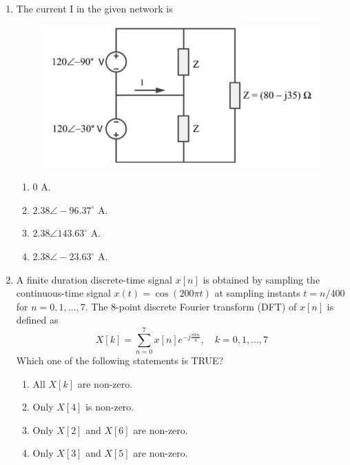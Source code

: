 \documentclass[a4paper, 11pt]{article}
\begin{document}
\begin{enumerate}
    \item The current I in the given network is
    \begin{figure}[H]
        \centering
        \includegraphics[width=0.5\columnwidth]{figs/Q28.png}
        \caption*{}
        \label{fig:q38}
    \end{figure}
    \begin{enumerate}
        \item 0 A.
        \item $2.38\angle-96.37^{\circ}$ A.
        \item $2.38\angle143.63^{\circ}$ A.
        \item $2.38\angle-23.63^{\circ}$ A.
    \end{enumerate}

    \hfill{}
    
    \item A finite duration discrete-time signal $x[n]$ is obtained by sampling the continuous-time signal $x(t)=\cos(200\pi t)$ at sampling instants $t = n/400$ for $n=0, 1, \dots, 7$. The 8-point discrete Fourier transform (DFT) of $x[n]$ is defined as 
    $$X[k] = \sum_{n=0}^{7} x[n] e^{-j\frac{\pi kn}{4}}, \quad k=0,1,\dots,7$$
    Which one of the following statements is TRUE?
    \begin{enumerate}
        \item All $X[k]$ are non-zero.
        \item Only $X[4]$ is non-zero.
        \item Only $X[2]$ and $X[6]$ are non-zero.
        \item Only $X[3]$ and $X[5]$ are non-zero.
    \end{enumerate}

    \hfill{}


\end{enumerate}
\end{document}
